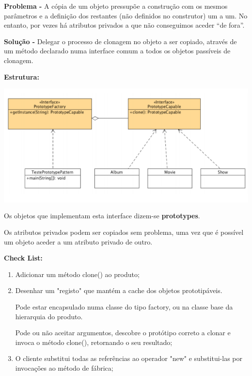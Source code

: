 \documentclass{article}
\begin{document}
\begin{flushleft}
    \textbf{Problema -} A cópia de um objeto pressupõe a construção com os mesmos parâmetros e a
    definição dos restantes (não definidos no construtor) um a um. No entanto, por vezes
    há atributos privados a que não conseguimos aceder “de fora”.

\end{flushleft}

\begin{flushleft}
    \textbf{Solução -} Delegar o processo de clonagem no objeto a ser copiado, através de um método
    declarado numa interface comum a todos os objetos passíveis de clonagem.
\end{flushleft}

\begin{flushleft}
    \textbf{Estrutura:}

    \begin{center}
        \includegraphics[scale=0.5]{Images/37.png}
    \end{center}

    Os objetos que implementam esta interface dizem-se \textbf{prototypes}.

    Os atributos privados podem ser copiados sem problema, uma vez que é possível um
    objeto aceder a um atributo privado de outro.

\end{flushleft}

\begin{flushleft}
    \textbf{Check List:}

    \begin{enumerate}
        \item Adicionar um método clone() ao produto;
        \item Desenhar um "registo" que mantém a cache dos objetos prototipáveis.
        
        Pode estar encapsulado numa classe do tipo factory, ou na classe base da
        hierarquia do produto.

        Pode ou não aceitar argumentos, descobre o protótipo correto a clonar e
        invoca o método clone(), retornando o seu resultado;

        \item O cliente substitui todas as referências ao operador "new" e substitui-las por
        invocações ao método de fábrica;
    \end{enumerate}
\end{flushleft}
\end{document}
